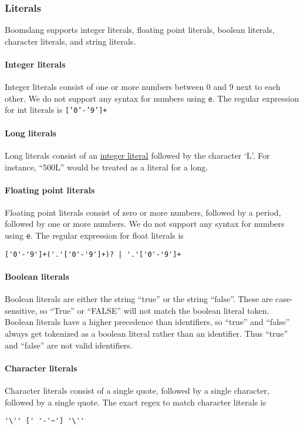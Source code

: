 \documentclass{article}
\begin{document}
\subsubsection{Literals}
Boomslang supports integer literals, floating point literals, boolean literals, character literals, and string literals.

\paragraph{Integer literals}
\label{sec:intliterals}
Integer literals consist of one or more numbers between 0 and 9 next to each other. We do not support any syntax for numbers using \texttt{e}. The regular expression for int literals is \texttt{['0'-'9']+}

\paragraph{Long literals}
\label{sec:longliterals}
Long literals consist of an \hyperref[sec:intliterals]{integer literal} followed by the character `L'. For instance, ``500L'' would be treated as a literal for a long.

\paragraph{Floating point literals}
Floating point literals consist of zero or more numbers, followed by a period, followed by one or more numbers. We do not support any syntax for numbers using \texttt{e}. The regular expression for float literals is \begin{verbatim}
['0'-'9']+('.'['0'-'9']+)? | '.'['0'-'9']+
\end{verbatim}

\paragraph{Boolean literals}
Boolean literals are either the string ``true'' or the string ``false''. These are case-sensitive, so ``True'' or ``FALSE'' will not match the boolean literal token. Boolean literals have a higher precedence than identifiers, so ``true'' and ``false'' always get tokenized as a boolean literal rather than an identifier. Thus ``true'' and ``false'' are not valid identifiers.

\paragraph{Character literals}
Character literals consist of a single quote, followed by a single character, followed by a single quote. The exact regex to match character literals is
\begin{verbatim}
'\'' [' '-'~'] '\''
\end{verbatim}
\end{document}
